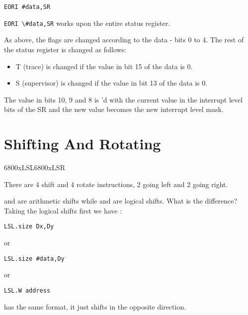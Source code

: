 \begin{lstlisting}[firstnumber=1,]
          EORI #data,SR
\end{lstlisting}

\lstinline{EORI \#data,SR} works upon the entire status register.

As above, the flags are changed according to the data -{} bits 0 to 4.
    The rest of the status register is changed as follows:
\begin{itemize}[itemsep=0pt]

\item{}T (trace) is changed if the value in bit 15 of the data is
        0.


\item{}S (supervisor) is changed if the value in bit 13 of the data is
        0.

\end{itemize}

The value in bits 10, 9 and 8 is 'd with the current value in the
    interrupt level bits of the SR and the new value becomes the new interrupt
    level mask.

\section{Shifting And Rotating}\mc6800x{LSL}\mc6800x{LSR}
\label{ch4-shift-rotate}%

There are 4 shift and 4 rotate instructions, 2 going left and 2
    going right.

 and  are arithmetic shifts while  and  are logical shifts. What is the difference? Taking the logical shifts first we have
   :

\begin{lstlisting}[firstnumber=1,]
          LSL.size Dx,Dy
\end{lstlisting}

or

\begin{lstlisting}[firstnumber=1,]
          LSL.size #data,Dy
\end{lstlisting}

or

\begin{lstlisting}[firstnumber=1,]
          LSL.W address
\end{lstlisting}

 has the same format, it just shifts in the opposite direction.
 

